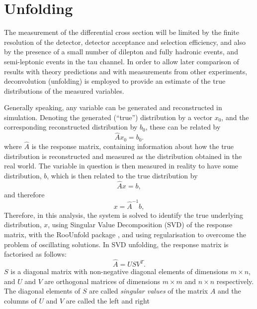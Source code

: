 \section{Unfolding}
\label{ss:unfolding}

The measurement of the differential cross section will be limited by the finite resolution of the detector,
detector acceptance and selection efficiency, and also by the presence of a small number of
dilepton and fully hadronic \ttbar events, and semi-leptonic events in the tau channel. In order to allow
later comparison of results with theory predictions and with measurements from other experiments,
deconvolution (unfolding) is employed to provide an estimate of the true distributions of the measured
variables.

Generally speaking, any variable can be generated and reconstructed in simulation. Denoting the generated
(``true'') distribution by a vector $x_{0}$, and the corresponding reconstructed distribution by $b_{0}$,
these can be related by
\begin{equation}
\label{eq:unfolding_MC}
\hat{A} x_0 = b_0.
\end{equation}
where $\hat{A}$ is the response matrix, containing information about how the true distribution is
reconstructed and measured as the distribution obtained in the real world. The variable in question is then
measured in reality to have some distribution, $b$, which is then related to the true distribution by
\begin{equation}
\label{eq:unfolding_data}
\hat{A} x = b,
\end{equation}
and therefore
\begin{equation}
\label{eq:unfolding_data_rearranged}
x = \hat{A}^{-1} b,
\end{equation}
Therefore, in this analysis, the system is solved to identify the true underlying distribution, $x$, using
Singular Value Decomposition (SVD) \cite{Hocker:1995kb} of the response matrix, with the RooUnfold package
\cite{Adye:2011gm}, and using regularisation to overcome the problem of oscillating solutions. In SVD
unfolding, the response matrix is factorised as follows:
\begin{equation}
\hat{A} = USV^{T}.
\label{eq:response}
\end{equation}
$S$ is a diagonal matrix with non-negative diagonal elements of dimensions $m \times n$, and $U$ and $V$ are
orthogonal matrices of dimensions $m \times m$ and $n \times n$ respectively. The diagonal elements of $S$ are
called \textit{singular values} of the matrix $A$ and the columns of $U$ and $V$ are called the left and right
